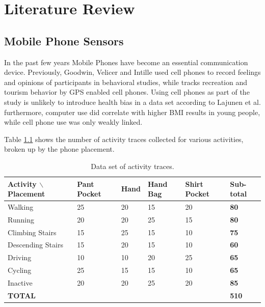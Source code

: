 \documentclass[12pt,a4paper,oneside]{book}
\begin{document}


\chapter{Literature Review}
\label{ch:Literature_Review}
%
\section{Mobile Phone Sensors}
In the past few years Mobile Phones have become an essential communication device. Previously, Goodwin, Velicer and Intille \cite{Goodwin2008} used cell phones to record feelings and opinions of participants in behavioral studies, while \cite{Ahas2007} tracks recreation and tourism behavior by GPS enabled cell phones. Using cell phones as part of the study is unlikely to introduce health bias in a data set according to Lajunen et al. \cite{Lajunen2007} furthermore, computer use did correlate with higher BMI results in young people, while cell phone use was only weakly linked.

Table \ref{tab:Activity_Traces} shows the number of activity traces collected for various activities, broken up by the phone placement.

\begin{table}[!tbh]
\renewcommand{\arraystretch}{1.5}
\caption{Data set of activity traces.}
\label{tab:Activity_Traces}
\centering
\begin{tabular}[width=\columnwidth]{|p{0.9in}||p{0.5in}|p{0.5in}|p{0.5in}|p{0.5in}|p{0.5in}|}
\hline
Activity $\backslash$ Placement & Pant Pocket & Hand & Hand Bag & Shirt Pocket & Sub-total \\
\hline
Walking             & 25 & 20 & 15 & 20 & \textbf{80} \\
Running             & 20 & 20 & 25 & 15 & \textbf{80} \\
Climbing Stairs     & 15 & 25 & 15 & 10 & \textbf{75} \\
Descending Stairs   & 15 & 20 & 15 & 10 & \textbf{60} \\
Driving             & 10 & 10 & 20 & 25 & \textbf{65} \\
Cycling             & 25 & 15 & 15 & 10 & \textbf{65} \\
Inactive            & 20 & 20 & 25 & 20 & \textbf{85} \\
\hline
\textbf{TOTAL}      &    &    &    &    & \textbf{510}\\
\hline
\end{tabular}
\end{table}
\end{document}
